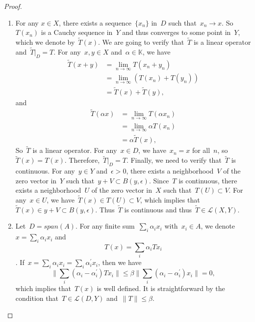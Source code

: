 \documentclass[12pt,a4paper,draft]{article}  %
\theoremstyle{definition}
\numberwithin{equation}{section}
\begin{document}
\begin{proof}
    \begin{enumerate}
        \item For any $x \in X$, there exists a sequence~$\{x_n\}$ in~$D$ such that~$x_n \rightarrow x$.
        So~$T(x_n)$ is a Cauchy sequence in~$Y$ and thus converges to some point in~$Y$, which we denote by~$\tilde{T}(x)$.
        We are going to verify that~$\tilde{T}$ is a linear operator and~$\tilde{T}|_D = T$.
        For any~$x,y \in X$ and~$\alpha \in \mathbb{K}$, we have
        \begin{align}
            \tilde{T}(x+y) & = \lim_{n \rightarrow \infty} T(x_n+y_n) \nonumber \\
            & = \lim_{n \rightarrow \infty} (T(x_n) + T(y_n)) \nonumber \\
            & = \tilde{T}(x) + \tilde{T}(y), \nonumber
        \end{align}
        and
        \begin{align}
            \tilde{T}(\alpha x) & = \lim_{n \rightarrow \infty} T(\alpha x_n) \nonumber \\
            & = \lim_{n \rightarrow \infty} \alpha T(x_n) \nonumber \\
            & = \alpha \tilde{T}(x), \nonumber
        \end{align}
        So~$\tilde{T}$ is a linear operator.
        For any~$x\in D$, we have~$x_n=x$ for all~$n$, so~$\tilde{T}(x)=T(x)$.
        Therefore,~$\tilde{T}|_D = T$.
        Finally, we need to verify that~$\tilde{T}$ is continuous.
        For any~$y \in Y$ and~$\epsilon > 0$, there exists a neighborhood~$V$ of the zero vector in~$Y$ such that~$y+V \subset B(y,\epsilon)$.
        Since~$T$ is continuous, there exists a neighborhood~$U$ of the zero vector in~$X$ such that~$T(U) \subset V$.
        For any~$x \in U$, we have~$\tilde{T}(x) \in T(U) \subset V$, which implies that~$\tilde{T}(x) \in y+V \subset B(y,\epsilon)$.
        Thus~$\tilde{T}$ is continuous and thus~$\tilde{T} \in \mathcal{L}(X,Y)$.
        \item Let~$D=span(A)$. For any finite sum~$\sum_{i}\alpha_i x_i$ with~$x_i \in A$, we denote~ 
        $x = \sum_{i}\alpha_i x_i$ and 
        $$T(x) = \sum_{i}\alpha_i Tx_i$$.
        If~$x=\sum_{i}\alpha_i x_i=\sum_{i}\alpha^{'}_i x_i$, then we have
        $$ \|\sum_{i}(\alpha_i-\alpha^{'}_i) Tx_i\| \leq \beta \|\sum_{i}(\alpha_i-\alpha^{'}_i) x_i\| = 0, $$
        which implies that~$T(x)$ is well defined.
        It is straightforward by the condition that~$T \in \mathcal{L}(D,Y)$ and~$\|T\| \leq \beta$.

\end{enumerate}
\end{proof}
\end{document}
